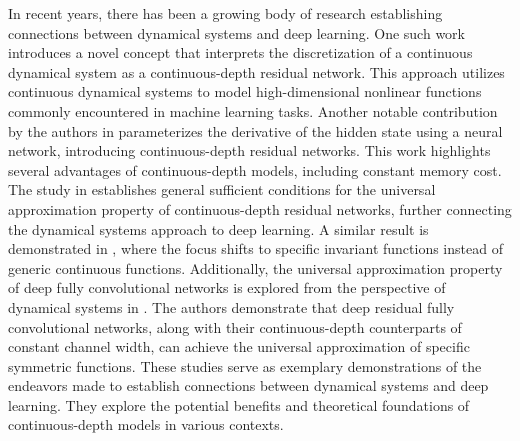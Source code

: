 \documentclass[nohyperref]{article}
\theoremstyle{plain}
\theoremstyle{definition}
\theoremstyle{remark}
\begin{document}
In recent years, there has been a growing body of research establishing connections between dynamical systems and deep learning. One such work  \cite{WeinanE2017dynamicalsystems} introduces a novel concept that interprets the discretization of a continuous dynamical system as a continuous-depth residual network. This approach utilizes continuous dynamical systems to model high-dimensional nonlinear functions commonly encountered in machine learning tasks.
Another notable contribution by the authors in \cite{NEURIPS2018_69386f6b} parameterizes the derivative of the hidden state using a neural network, introducing continuous-depth residual networks. This work highlights several advantages of continuous-depth models, including constant memory cost.
The study in \cite{2019arXiv191210382L} establishes general sufficient conditions for the universal approximation property of continuous-depth residual networks, further connecting the dynamical systems approach to deep learning. 
A similar result is demonstrated in \cite{2022arXiv220808707L}, where the focus shifts to specific invariant functions instead of generic continuous functions.
Additionally, the universal approximation property of deep fully convolutional networks is explored from the perspective of dynamical systems in \cite{2022arXiv221114047L}. The authors demonstrate that deep residual fully convolutional networks, along with their continuous-depth counterparts of constant channel width, can achieve the universal approximation of specific symmetric functions.
These studies serve as exemplary demonstrations of the endeavors made to establish connections between dynamical systems and deep learning. They explore the
potential benefits and theoretical foundations of continuous-depth models in various contexts.

\end{document}
